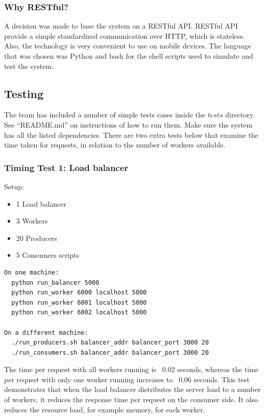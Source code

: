 \documentclass{sigchi}
\begin{document}
\subsubsection{Why RESTful?}

A decision was made to base the system on a RESTful API. RESTful API provide a simple standardized communication over HTTP, which is stateless. Also, the technology is very convenient to use on mobile devices. The language that was chosen was Python and bash for the shell scripts used to simulate and test the system. 

\subsection{Testing}

The team has included a number of simple tests cases inside the $tests$ directory. See \enquote{README.md} on instructions of how to run them. Make sure the system has all the listed dependencies. There are two extra tests below that examine the time taken for requests, in relation to the number of workers available.

\subsubsection{Timing Test 1: Load balancer}

Setup:

\begin{itemize}
  \item 1 Load balancer
  \item 3 Workers
  \item 20 Producers
  \item 5 Consumers scripts
\end{itemize}

\vspace*{\baselineskip}
\begin{lstlisting}[caption={Timing test 1: instructions}, mathescape, upquote=true]
On one machine:
  python run_balancer 5000
  python run_worker 6000 localhost 5000
  python run_worker 6001 localhost 5000
  python run_worker 6002 localhost 5000

On a different machine:
  ./run_producers.sh balancer_addr balancer_port 3000 20
  ./run_consumers.sh balancer_addr balancer_port 3000 20
\end{lstlisting}

The time per request with all workers running is ~0.02 seconds, whereas the time per request with only one worker running increases to ~0.06 seconds. This test demonstrates that when the load balancer distributes the server load to a number of workers, it reduces the response time per request on the consumer side. It also reduces the resource load, for example memory, for each worker.
\end{document}
